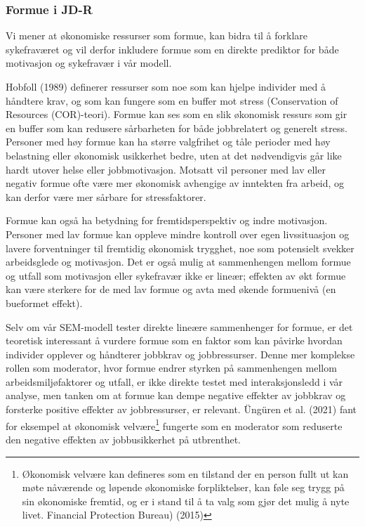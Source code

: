 \documentclass[
  12pt,
  a4paper,
  DIV=11,
  numbers=noendperiod]{scrartcl}
\begin{document}
\subsubsection{Formue i JD-R}\label{sec-formue-jdr}

Vi mener at økonomiske ressurser som formue, kan bidra til å forklare
sykefraværet og vil derfor inkludere formue som en direkte prediktor for
både motivasjon og sykefravær i vår modell.

Hobfoll (1989) definerer ressurser som noe som kan hjelpe individer med
å håndtere krav, og som kan fungere som en buffer mot stress
(Conservation of Resources (COR)-teori). Formue kan ses som en slik
økonomisk ressurs som gir en buffer som kan redusere sårbarheten for
både jobbrelatert og generelt stress. Personer med høy formue kan ha
større valgfrihet og tåle perioder med høy belastning eller økonomisk
usikkerhet bedre, uten at det nødvendigvis går like hardt utover helse
eller jobbmotivasjon. Motsatt vil personer med lav eller negativ formue
ofte være mer økonomisk avhengige av inntekten fra arbeid, og kan derfor
være mer sårbare for stressfaktorer.

Formue kan også ha betydning for fremtidsperspektiv og indre motivasjon.
Personer med lav formue kan oppleve mindre kontroll over egen
livssituasjon og lavere forventninger til fremtidig økonomisk trygghet,
noe som potensielt svekker arbeidsglede og motivasjon. Det er også mulig
at sammenhengen mellom formue og utfall som motivasjon eller sykefravær
ikke er lineær; effekten av økt formue kan være sterkere for de med lav
formue og avta med økende formuenivå (en bueformet effekt).

Selv om vår SEM-modell tester direkte lineære sammenhenger for formue,
er det teoretisk interessant å vurdere formue som en faktor som kan
påvirke hvordan individer opplever og håndterer jobbkrav og
jobbressurser. Denne mer komplekse rollen som moderator, hvor formue
endrer styrken på sammenhengen mellom arbeidsmiljøfaktorer og utfall, er
ikke direkte testet med interaksjonsledd i vår analyse, men tanken om at
formue kan dempe negative effekter av jobbkrav og forsterke positive
effekter av jobbressurser, er relevant. Üngüren et al. (2021) fant for
eksempel at økonomisk velvære\footnote{Økonomisk velvære kan defineres
  som en tilstand der en person fullt ut kan møte nåværende og løpende
  økonomiske forpliktelser, kan føle seg trygg på sin økonomiske
  fremtid, og er i stand til å ta valg som gjør det mulig å nyte livet.
  Financial Protection Bureau) (2015)} fungerte som en moderator som
reduserte den negative effekten av jobbusikkerhet på utbrenthet.
\end{document}
